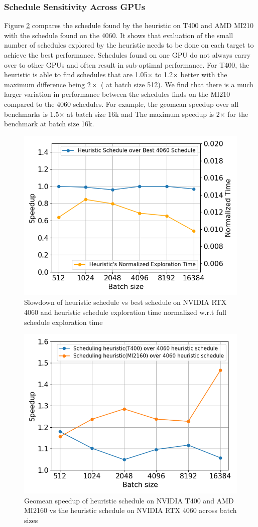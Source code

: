 \subsubsection*{Schedule Sensitivity Across GPUs}
Figure \ref{Fig:AutotuningSpeedupvs4060Sched}
compares the schedule found by the heuristic on T400 and AMD MI210 with the schedule found on the 4060.
It shows that evaluation of the small number of schedules explored by the heuristic needs to be 
done on each target to achieve the best performance.
Schedules found on one GPU do not always carry over to other GPUs and often result in sub-optimal performance.
For T400, the heuristic is able to find schedules that are 1.05$\times$ to 1.2$\times$ better 
with the maximum difference being $2\times$ ( at batch size 512).
We find that there is a much larger variation in performance 
between the schedules \Treebeard{} finds on the MI210 compared to the 4060 schedules. For example, 
the geomean speedup over all benchmarks is 1.5$\times$ at batch size 16k and 
The maximum speedup is 2$\times$ for the  benchmark at batch size 16k.

\begin{figure}[htb]
  \centering
  \includegraphics[width=0.65\linewidth]{figures/speedup_vs_norm_time_line_graph_4060.png}
  \caption{Slowdown of heuristic schedule vs best schedule on NVIDIA RTX 4060 and 
  heuristic schedule exploration time normalized w.r.t full schedule exploration time}
  \label{Fig:HeuristicVsFullExplore_Speedup}
\end{figure}

\begin{figure}[htb]
  \centering
  \includegraphics[width=0.65\linewidth]{figures/geomean_speedup_T400_4060_vs_T400_vs_MI2160.png}
  \caption{Geomean speedup of heuristic schedule on NVIDIA T400 and AMD MI2160 vs 
  the heuristic schedule on NVIDIA RTX 4060 across batch sizes}
  \label{Fig:AutotuningSpeedupvs4060Sched}
\end{figure}


